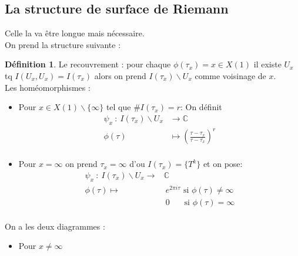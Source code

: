 \documentclass[12pt]{article}
\theoremstyle{plain}
\theoremstyle{definition}
\newtheorem{defn}[subsubsection]{D\'efinition}
\theoremstyle{remark}
\newcommand{\C}{\mathbb{C}}
\begin{document}
\newpage

\subsection{La structure de surface de Riemann}
Celle la va être longue mais nécessaire.\\

On prend la structure suivante : 
\begin{defn}
    Le recouvrement : pour chaque $\phi(\tau_x)=x\in X(1)$ il existe $U_x$ tq $I(U_x,U_x)=I(\tau_x)$ alors on
prend $I(\tau_x)\backslash U_x$ comme voisinage de $x$.\\
\newline
\indent Les homéomorphismes :
    \begin{itemize}
        \item Pour $x\in X(1)\backslash\{\infty\}$ tel que $\# I(\tau_x)=r$: On définit 
        \begin{align*}
            \psi_x~:~I(\tau_x)\backslash U_x&\rightarrow \C\\
                \phi(\tau)&\mapsto \left(\frac{\tau-\tau_x}{\tau-\overline{\tau_x}}\right)^r\\
        \end{align*}
        \item Pour $x=\infty$ on prend $\tau_x=\infty$ d'ou $I(\tau_x)=\{T^k\}$ et on pose:
        \begin{align*}
            \psi_x~:~I(\tau_x)\backslash U_x\rightarrow& \C\\
                \phi(\tau)\mapsto& ~e^{2\pi i\tau}\text{  si } \phi(\tau)\ne \infty\\
                                 & ~0 ~~\quad \text{ si } \phi(\tau)=\infty\\
        \end{align*}
    \end{itemize}
\end{defn}

\newpage
On a les deux diagrammes :\\ 
\begin{itemize}
    \item Pour $x\ne\infty$
\end{itemize}

\begin{center}
\end{center}
\end{document}
